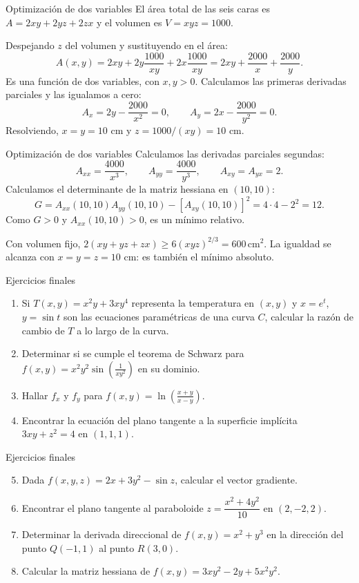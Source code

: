 \documentclass[original_version/main.tex]{subfiles}
\begin{document}
\begin{frame}{Optimización de dos variables}
\small El área total de las seis caras es $A=2xy+2yz+2zx$ y el volumen es $V=xyz=1000$.
\medskip

Despejando $z$ del volumen y sustituyendo en el área:
\[A(x,y)=2xy+2y\frac{1000}{xy}+2x\frac{1000}{xy}=2xy+\frac{2000}x+\frac{2000}y.\]
Es una función de dos variables, con $x,y>0$. Calculamos las primeras derivadas parciales y las igualamos a cero:
\[A_x=2y-\frac{2000}{x^2}=0,\qquad A_y=2x-\frac{2000}{y^2}=0.\]
Resolviendo, $x=y=10$ cm y $z=1000/(xy)=10$ cm.
\end{frame}
\begin{frame}{Optimización de dos variables}
\small Calculamos las derivadas parciales segundas:
\[A_{xx}=\frac{4000}{x^3},\qquad A_{yy}=\frac{4000}{y^3},\qquad A_{xy}=A_{yx}=2.\]
Calculamos el determinante de la matriz hessiana en $(10,10)$:
\[G=A_{xx}(10,10)A_{yy}(10,10)-[A_{xy}(10,10)]^2=4\cdot4-2^2=12.\]
Como $G>0$ y $A_{xx}(10,10)>0$, es un mínimo relativo.
\medskip

Con volumen fijo, $2(xy+yz+zx)\ge6(xyz)^{2/3}=600\,\mathrm{cm}^2$. La igualdad se alcanza con $x=y=z=10$ cm: es también el mínimo absoluto.
\end{frame}
\begin{frame}{Ejercicios finales}
\small\begin{enumerate}
\item Si $T(x,y)=x^2y+3xy^4$ representa la temperatura en $(x,y)$ y $x=e^t$, $y=\sin t$ son las ecuaciones paramétricas de una curva $C$, calcular la razón de cambio de $T$ a lo largo de la curva.
\item Determinar si se cumple el teorema de Schwarz para $f(x,y)=x^2y^2\sin\!\left(\frac1{xy^2}\right)$ en su dominio.
\item Hallar $f_x$ y $f_y$ para $f(x,y)=\ln\!\left(\frac{x+y}{x-y}\right)$.
\item Encontrar la ecuación del plano tangente a la superficie implícita $3xy+z^2=4$ en $(1,1,1)$.
\end{enumerate}
\end{frame}
\begin{frame}{Ejercicios finales}
\small\begin{enumerate}\setcounter{enumi}{4}
\item Dada $f(x,y,z)=2x+3y^2-\sin z$, calcular el vector gradiente.
\item Encontrar el plano tangente al paraboloide $z=\dfrac{x^2+4y^2}{10}$ en $(2,-2,2)$.
\item Determinar la derivada direccional de $f(x,y)=x^2+y^3$ en la dirección del punto $Q(-1,1)$ al punto $R(3,0)$.
\item Calcular la matriz hessiana de $f(x,y)=3xy^2-2y+5x^2y^2$.
\end{enumerate}
\end{frame}
\end{document}
